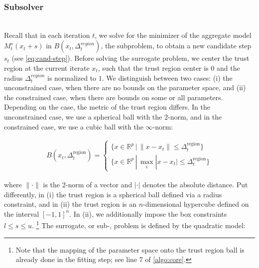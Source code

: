 \subsubsection{Subsolver}
\label{subsubsec:subsolver}
\hfill\\

\noindent Recall that in each iteration $t$, we solve for the minimizer of the aggregate model $M_{t}^{s} (x_t + s)$ in $B(x_t, \Delta_t^{region})$, the subproblem, to obtain a new candidate step $s_t$ (see \ref{eq:cand-step}).
Before solving the surrogate problem, we center the trust region at the current iterate $x_t$, such that the trust region center is $0$ and the radius $\Delta^{region}_{t}$ is normalized to $1$.
We distinguish between two cases: (i) the unconstrained case, when there are no bounds on the parameter space, and (ii) the constrained case, when there are bounds on some or all parameters.
Depending on the case, the metric of the trust region differs. In the unconstrained case, we use a spherical ball with the 2-norm, and in the constrained case, we use a cubic ball with the $\infty$-norm:


\begin{align}
    B(x_t, \Delta_t^{\text{region}}) = \begin{cases}
    \{ x \in \mathbb{R}^p \, | \, \lVert x - x_t \rVert \leq \Delta_t^{\text{region}} \}
    \\
    \{ x \in \mathbb{R}^p \, | \, \max_{i} |x - x_{t}| \leq \Delta_t^{\text{region}} \}
    \end{cases}
    \label{eq:ball-metric}
\end{align}

\noindent where $\lVert\cdot\rVert$ is the 2-norm of a vector and $|\cdot|$ denotes the absolute distance. Put differently, in (i) the trust region is a spherical ball defined via a radius constraint, and in (ii) the trust region is an $n$-dimensional hypercube defined on the interval $[-1, 1]^n$. In (ii), we additionally impose the box constraints $l \leq s \leq u$.
\footnote{Note that the mapping of the parameter space onto the trust region ball is already done in the fitting step; see line 7 of \ref{algo:core}.}
The surrogate, or sub-, problem is defined by the quadratic model:


